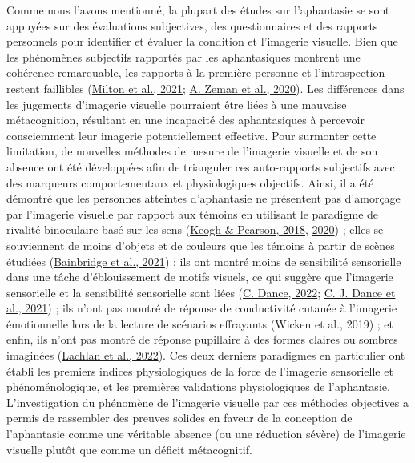 \documentclass[
  12pt,
]{article}
\begin{document}
Comme nous l'avons mentionné, la plupart des études sur l'aphantasie se
sont appuyées sur des évaluations subjectives, des questionnaires et des
rapports personnels pour identifier et évaluer la condition et
l'imagerie visuelle. Bien que les phénomènes subjectifs rapportés par
les aphantasiques montrent une cohérence remarquable, les rapports à la
première personne et l'introspection restent faillibles
(\protect\hyperlink{ref-miltonBehavioralNeuralSignatures2021}{Milton et
al., 2021};
\protect\hyperlink{ref-zemanPhantasiaPsychologicalSignificance2020}{A.
Zeman et al., 2020}). Les différences dans les jugements d'imagerie
visuelle pourraient être liées à une mauvaise métacognition, résultant
en une incapacité des aphantasiques à percevoir consciemment leur
imagerie potentiellement effective. Pour surmonter cette limitation, de
nouvelles méthodes de mesure de l'imagerie visuelle et de son absence
ont été développées afin de trianguler ces auto-rapports subjectifs avec
des marqueurs comportementaux et physiologiques objectifs. Ainsi, il a
été démontré que les personnes atteintes d'aphantasie ne présentent pas
d'amorçage par l'imagerie visuelle par rapport aux témoins en utilisant
le paradigme de rivalité binoculaire basé sur les sens
(\protect\hyperlink{ref-keoghBlindMindNo2018}{Keogh \& Pearson, 2018},
\protect\hyperlink{ref-keoghAttentionDrivenPhantom2020}{2020}) ; elles
se souviennent de moins d'objets et de couleurs que les témoins à partir
de scènes étudiées
(\protect\hyperlink{ref-bainbridgeQuantifyingAphantasiaDrawing2021}{Bainbridge
et al., 2021}) ; ils ont montré moins de sensibilité sensorielle dans
une tâche d'éblouissement de motifs visuels, ce qui suggère que
l'imagerie sensorielle et la sensibilité sensorielle sont liées
(\protect\hyperlink{ref-danceLessSensoryOverwhelm2022}{C. Dance, 2022};
\protect\hyperlink{ref-danceWhatLinkMental2021}{C. J. Dance et al.,
2021}) ; ils n'ont pas montré de réponse de conductivité cutanée à
l'imagerie émotionnelle lors de la lecture de scénarios effrayants
(Wicken et al., 2019) ; et enfin, ils n'ont pas montré de réponse
pupillaire à des formes claires ou sombres imaginées
(\protect\hyperlink{ref-lachlanPupillaryLightResponse2022}{Lachlan et
al., 2022}). Ces deux derniers paradigmes en particulier ont établi les
premiers indices physiologiques de la force de l'imagerie sensorielle et
phénoménologique, et les premières validations physiologiques de
l'aphantasie. L'investigation du phénomène de l'imagerie visuelle par
ces méthodes objectives a permis de rassembler des preuves solides en
faveur de la conception de l'aphantasie comme une véritable absence (ou
une réduction sévère) de l'imagerie visuelle plutôt que comme un déficit
métacognitif.
\end{document}

